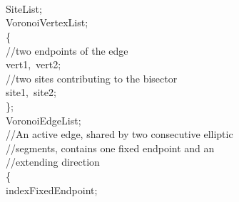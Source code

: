\noindent{}\\
\noindent{}\vspace{3mm}\\
\noindent{}\\
\noindent{} SiteList;\\
\noindent{} VoronoiVertexList;\vspace{3mm}\\
\noindent{} \{\\
\noindent\makebox[6mm]{}\makebox[6mm]{}//two endpoints of the edge\\
\noindent\makebox[6mm]{} vert1,~vert2;\\
\noindent\makebox[6mm]{}\makebox[6mm]{}//two sites contributing to the bisector\\
\noindent\makebox[6mm]{} site1,~site2;\\
\noindent\makebox[6mm]{}\};\\
\noindent{} VoronoiEdgeList;\vspace{3mm}\\
\noindent\makebox[6mm]{}//An active edge, shared by two consecutive elliptic\\
\noindent\makebox[6mm]{}//segments, contains one fixed endpoint and an\\
\noindent\makebox[6mm]{}//extending direction\\
\noindent{} \{\\
\noindent\makebox[6mm]{} indexFixedEndpoint; \\

